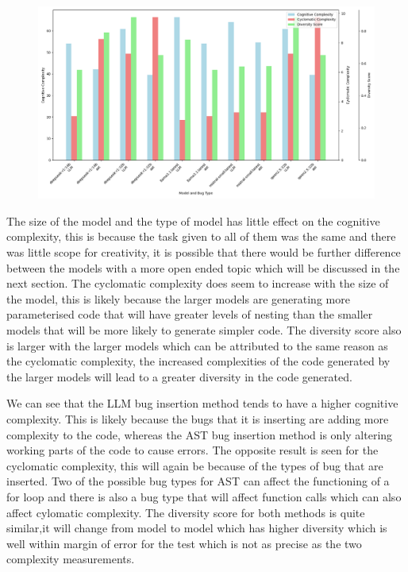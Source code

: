 \documentclass[12pt]{extarticle}
\begin{document}
\begin{figure}[h!]
\centering
\includegraphics[width=\linewidth]{Images/Complexity_Comparison_Fibbonaci.png}
\label{fig:Complexity_Benchmark}
\end{figure}

The size of the model and the type of model has little effect on the cognitive complexity, this is because the task given to all of them was the same and there was little scope for creativity, it is possible that there would be further difference between the models with a more open ended topic which will be discussed in the next section. The cyclomatic complexity does seem to increase with the size of the model, this is likely because the larger models are generating more parameterised code that will have greater levels of nesting than the smaller models that will be more likely to generate simpler code. The diversity score also is larger with the larger models which can be attributed to the same reason as the cyclomatic complexity, the increased complexities of the code generated by the larger models will lead to a greater diversity in the code generated.

We can see that the LLM bug insertion method tends to have a higher cognitive complexity. This is likely because the bugs that it is inserting are adding more complexity to the code, whereas the AST bug insertion method is only altering working parts of the code to cause errors. The opposite result is seen for the cyclomatic complexity, this will again be because of the types of bug that are inserted. Two of the possible bug types for AST can affect the functioning of a for loop and there is also a bug type that will affect function calls which can also affect cylomatic complexity. The diversity score for both methods is quite similar,it will change from model to model which has higher diversity which is well within margin of error for the test which is not as precise as the two complexity measurements.
\end{document}
